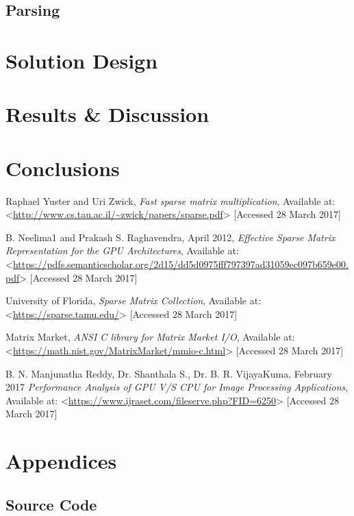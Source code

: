\documentclass[12pt]{article}
\begin{document}
\subsection*{Parsing}


\section*{Solution Design}


\section*{Results \& Discussion}


\pagebreak
\section*{Conclusions}

 

\newpage
\begin{thebibliography}{0}

Raphael Yuster and Uri Zwick, \textit{Fast sparse matrix multiplication}, Available at: <\url{http://www.cs.tau.ac.il/~zwick/papers/sparse.pdf}> [Accessed 28 March 2017]

B. Neelima1 and Prakash S. Raghavendra, April 2012,  \textit{Effective Sparse Matrix Representation for the
GPU Architectures}, Available at: <\url{https://pdfs.semanticscholar.org/2d15/dd5d0975fff797397ad31059ec097b659e00.pdf}> [Accessed 28 March 2017]

University of Florida, \textit{Sparse Matrix Collection}, Available at: <\url{https://sparse.tamu.edu/}> [Accessed 28 March 2017]

Matrix Market, \textit{ANSI C library for Matrix Market I/O}, Available at: <\url{https://math.nist.gov/MatrixMarket/mmio-c.html}> [Accessed 28 March 2017]

B. N. Manjunatha Reddy, Dr. Shanthala S., Dr. B. R. VijayaKuma, February 2017 \textit{Performance Analysis of GPU V/S CPU for Image
Processing Applications}, Available at: <\url{https://www.ijraset.com/fileserve.php?FID=6250}> [Accessed 28 March 2017]


\end{thebibliography}
\newpage

\section*{Appendices}


\newpage

\subsection*{Source Code}


\end{document}
